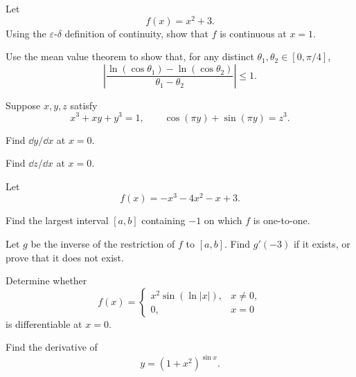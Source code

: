 \begin{problem}
\begin{problemsubparts}
\item Let
\[
f(x)=x^2+3.
\]
Using the $\varepsilon$-$\delta$ definition of continuity, show that $f$ is continuous at $x=1$.
\item Use the mean value theorem to show that, for any distinct $\theta_1,\theta_2\in[0,\pi/4]$,
\[
\left|
\frac{\ln(\cos\theta_1)-\ln(\cos\theta_2)}{\theta_1-\theta_2}
\right|
\le1.
\]
\end{problemsubparts}
\end{problem}

\begin{problem}
Suppose $x,y,z$ satisfy
\[
x^3+xy+y^3=1,
\qquad
\cos(\pi y)+\sin(\pi y)=z^3.
\]
\begin{problemsubparts}
\item Find $\dd y/\dd x$ at $x=0$.
\item Find $\dd z/\dd x$ at $x=0$.
\end{problemsubparts}
\end{problem}

\begin{problem}
Let
\[
f(x)=-x^3-4x^2-x+3.
\]
\begin{problemsubparts}
\item Find the largest interval $[a,b]$ containing $-1$ on which $f$ is one-to-one.
\item Let $g$ be the inverse of the restriction of $f$ to $[a,b]$. Find $g'(-3)$ if it exists, or prove that it does not exist.
\end{problemsubparts}
\end{problem}

\begin{problem}
\begin{problemsubparts}
\item Determine whether
\[
f(x)=
\begin{cases}
x^2\sin(\ln|x|), & x\ne0,\\
0, & x=0
\end{cases}
\]
is differentiable at $x=0$.
\item Find the derivative of
\[
y=(1+x^2)^{\sin x}.
\]
\end{problemsubparts}
\end{problem}

